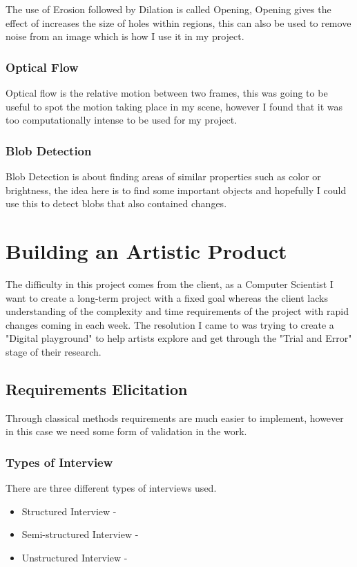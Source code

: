 \documentclass[a4paper]{report}
\begin{document}
The use of Erosion followed by Dilation is called Opening, Opening gives the effect of increases the size of holes within regions, this can also be used to remove noise from an image which is how I use it in my project.

\subsection{Optical Flow}
Optical flow is the relative motion between two frames, this was going to be useful to spot the motion taking place in my scene, however I found that it was too computationally intense to be used for my project.

\subsection{Blob Detection}
Blob Detection is about finding areas of similar properties such as color or brightness, the idea here is to find some important objects and hopefully I could use this to detect blobs that also contained changes.

\chapter{Building an Artistic Product}
The difficulty in this project comes from the client, as a Computer Scientist I want to create a long-term project with a fixed goal whereas the client lacks understanding of the complexity and time requirements of the project with rapid changes coming in each week. The resolution I came to was trying to create a "Digital playground" to help artists explore and get through the "Trial and Error" stage of their research.

\section{Requirements Elicitation}
Through classical methods requirements are much easier to implement, however in this case we need some form of validation in the work.

\subsection{Types of Interview}
There are three different types of interviews used.

\begin{itemize}
\item Structured Interview -
\item Semi-structured Interview -
\item Unstructured Interview -
\end{itemize}
\end{document}
